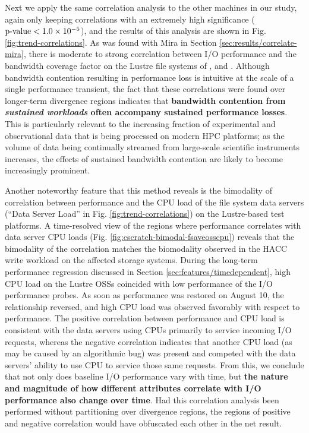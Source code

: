 Next we apply the same correlation analysis to the other machines in our study, again only keeping correlations with an extremely high significance ($\textup{p-value} < {1.0 \times 10^{-5}}$), and the results of this analysis are shown in Fig. \ref{fig:trend-correlations}.
As was found with Mira in Section \ref{sec:results/correlate-mira}, there is moderate to strong correlation between I/O performance and the bandwidth coverage factor on the Lustre file systems of \cori, and \edison.
Although bandwidth contention resulting in performance loss is intuitive at the scale of a single performance transient, the fact that these correlations were found over longer-term divergence regions indicates that \textbf{bandwidth contention from \emph{sustained workloads} often accompany sustained performance losses}.
This is particularly relevant to the increasing fraction of experimental and observational data that is being processed on modern HPC platforms; as the volume of data being continually streamed from large-scale scientific instruments increases, the effects of sustained bandwidth contention are likely to become increasingly prominent.


Another noteworthy feature that this method reveals is the bimodality of correlation between performance and the CPU load of the file system data servers (``Data Server Load'' in Fig. \ref{fig:trend-correlations}) on the Lustre-based test platforms.
A time-resolved view of the regions where performance correlates with data server CPU loads (Fig. \ref{fig:cscratch-bimodal-fsaveosscpu}) reveals that the bimodality of the correlation matches the biomodality observed in the HACC write workload on the affected storage systems.
During the long-term performance regression discussed in Section \ref{sec:features/timedependent}, high CPU load on the Lustre OSSs coincided with low performance of the I/O performance probes.
As soon as performance was restored on August 10, the relationship reversed, and high CPU load was observed favorably with respect to performance.
The positive correlation between performance and CPU load is consistent with the data servers using CPUs primarily to service incoming I/O requests, whereas the negative correlation indicates that another CPU load (as may be caused by an algorithmic bug) was present and competed with the data servers' ability to use CPU to service those same requests.
From this, we conclude that not only does baseline I/O performance vary with time, but \textbf{the nature and magnitude of how different attributes correlate with I/O performance also change over time}.
Had this correlation analysis been performed without partitioning over divergence regions, the regions of positive and negative correlation would have obfuscated each other in the net result.

